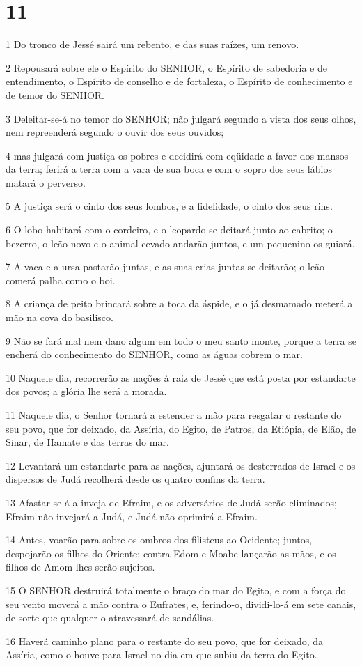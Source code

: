 \chapter{11}

\par 1 Do tronco de Jessé sairá um rebento, e das suas raízes, um renovo.
\par 2 Repousará sobre ele o Espírito do SENHOR, o Espírito de sabedoria e de entendimento, o Espírito de conselho e de fortaleza, o Espírito de conhecimento e de temor do SENHOR.
\par 3 Deleitar-se-á no temor do SENHOR; não julgará segundo a vista dos seus olhos, nem repreenderá segundo o ouvir dos seus ouvidos;
\par 4 mas julgará com justiça os pobres e decidirá com eqüidade a favor dos mansos da terra; ferirá a terra com a vara de sua boca e com o sopro dos seus lábios matará o perverso.
\par 5 A justiça será o cinto dos seus lombos, e a fidelidade, o cinto dos seus rins.
\par 6 O lobo habitará com o cordeiro, e o leopardo se deitará junto ao cabrito; o bezerro, o leão novo e o animal cevado andarão juntos, e um pequenino os guiará.
\par 7 A vaca e a ursa pastarão juntas, e as suas crias juntas se deitarão; o leão comerá palha como o boi.
\par 8 A criança de peito brincará sobre a toca da áspide, e o já desmamado meterá a mão na cova do basilisco.
\par 9 Não se fará mal nem dano algum em todo o meu santo monte, porque a terra se encherá do conhecimento do SENHOR, como as águas cobrem o mar.
\par 10 Naquele dia, recorrerão as nações à raiz de Jessé que está posta por estandarte dos povos; a glória lhe será a morada.
\par 11 Naquele dia, o Senhor tornará a estender a mão para resgatar o restante do seu povo, que for deixado, da Assíria, do Egito, de Patros, da Etiópia, de Elão, de Sinar, de Hamate e das terras do mar.
\par 12 Levantará um estandarte para as nações, ajuntará os desterrados de Israel e os dispersos de Judá recolherá desde os quatro confins da terra.
\par 13 Afastar-se-á a inveja de Efraim, e os adversários de Judá serão eliminados; Efraim não invejará a Judá, e Judá não oprimirá a Efraim.
\par 14 Antes, voarão para sobre os ombros dos filisteus ao Ocidente; juntos, despojarão os filhos do Oriente; contra Edom e Moabe lançarão as mãos, e os filhos de Amom lhes serão sujeitos.
\par 15 O SENHOR destruirá totalmente o braço do mar do Egito, e com a força do seu vento moverá a mão contra o Eufrates, e, ferindo-o, dividi-lo-á em sete canais, de sorte que qualquer o atravessará de sandálias.
\par 16 Haverá caminho plano para o restante do seu povo, que for deixado, da Assíria, como o houve para Israel no dia em que subiu da terra do Egito.

